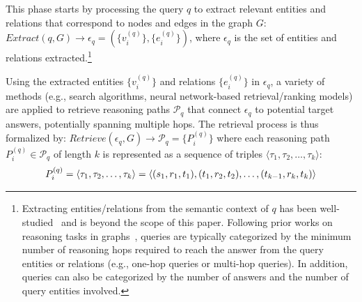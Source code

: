 \begin{definition}
	\label{def:retrieval}
This phase starts by processing the query $q$ to extract relevant entities and relations that correspond to nodes and edges in the graph $G$: $\textit{Extract} (q, G) \rightarrow \epsilon_q=(\{v_i^{(q)}\}, \{e_i^{(q)}\})$, 
where $\epsilon_q$ is the set of entities and relations extracted.\footnote{ Extracting entities/relations from the semantic context of $q$ has been well-studied~\cite{NSM, EmbedKGQA, StructGPT} and is beyond the scope of this paper.
Following prior works on reasoning tasks in graphs~\cite{UHop,berant-etal-2013-semantic,yih-etal-2014-semantic,complex2simple,EmbedKGQA}, queries are typically categorized by the minimum number of reasoning hops required to reach the answer from the query entities or relations (e.g., one-hop queries or multi-hop queries). 
In addition, queries can also be categorized by the number of answers and the number of query entities involved. 
}

Using the extracted entities $\{v_i^{(q)}\}$ and relations $\{e_i^{(q)}\}$ in $\epsilon_q$, a variety of methods (e.g., search algorithms, neural network-based retrieval/ranking models) are applied to retrieve reasoning paths $ \mathcal{P}_q$ 
that connect $\epsilon_q$ to potential target answers, potentially spanning multiple hops.
The retrieval process is thus formalized by: $\textit{Retrieve} (\epsilon_q, G) \rightarrow \mathcal{P}_q=\{P_i^{(q)}\}$
where each reasoning path $P_i^{(q)}\in \mathcal{P}_q$ of length $k$ is represented as a sequence of triples $\langle \tau_1, \tau_2, \ldots, \tau_k \rangle$: 
\begin{align*}
\small
P_i^{(q)} = \langle \tau_1, \tau_2, \ldots, \tau_k \rangle=\langle (s_1, r_1, t_1), (t_1, r_2, t_2), \ldots, (t_{k-1}, r_k, t_k) \rangle %
\end{align*}

\end{definition}

